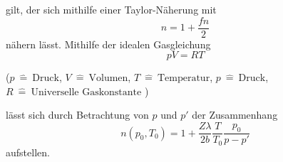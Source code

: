gilt, der sich mithilfe einer Taylor-Näherung mit
\begin{equation}
  n=1+\frac{fn}{2}
\end{equation}
nähern lässt. %
Mithilfe der idealen Gasgleichung
\begin{equation}
  p V = R T
\end{equation}
\begin{center}
 \small {($ p \: \hat{=} \:\text{Druck}$, $ V \: \hat{=} \:\text{Volumen}$, $ T \: \hat{=} \:\text{Temperatur}$, $ p \: \hat{=} \:\text{Druck}$, $ R \: \hat{=} \:\text{Universelle Gaskonstante}$ )}
\end{center}
lässt sich durch Betrachtung von $p$ und $p'$ der Zusammenhang
\begin{equation}
  n(p_0,T_0)=1+\frac{Z\lambda}{2b}\frac{T}{T_0}\frac{p_0}{p-p'}
\end{equation}
aufstellen.
